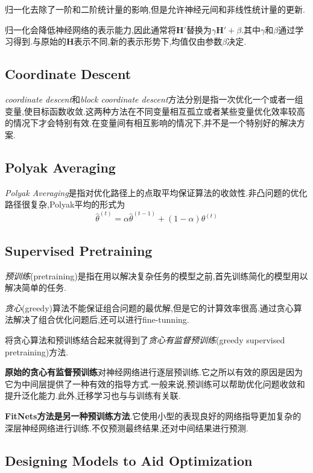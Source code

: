 归一化去除了一阶和二阶统计量的影响,但是允许神经元间和非线性统计量的更新.

归一化会降低神经网络的表示能力,因此通常将$\mathbf H'$替换为$\gamma\mathbf H'+\beta$.其中$\gamma$和$\beta$通过学习得到.与原始的$\mathbf H$表示不同,新的表示形势下,均值仅由参数$\beta$决定.

\subsection{Coordinate Descent}

\textit{coordinate descent}和\textit{block coordinate descent}方法分别是指一次优化一个或者一组变量,使目标函数收敛.这两种方法在不同变量相互孤立或者某些变量优化效率较高的情况下才会特别有效.在变量间有相互影响的情况下,并不是一个特别好的解决方案.

\subsection{Polyak Averaging}

\textit{Polyak Averaging}是指对优化路径上的点取平均保证算法的收敛性.非凸问题的优化路径很复杂,Polyak平均的形式为
\begin{equation}
\hat\theta^{(t)}=\alpha\hat\theta^{(t-1)}+(1-\alpha)\theta^{(t)}
\end{equation}

\subsection{Supervised Pretraining}

\textit{预训练}(pretraining)是指在用以解决复杂任务的模型之前,首先训练简化的模型用以解决简单的任务.

\textit{贪心}(greedy)算法不能保证组合问题的最优解,但是它的计算效率很高.通过贪心算法解决了组合优化问题后,还可以进行fine-tunning.

将贪心算法和预训练结合起来就得到了\textit{贪心有监督预训练}(greedy supervised pretraining)方法.

\textbf{原始的贪心有监督预训练}对神经网络进行逐层预训练.它之所以有效的原因是因为它为中间层提供了一种有效的指导方式.一般来说,预训练可以帮助优化问题收敛和提升泛化能力.此外,迁移学习也与与训练有关联.

\textbf{FitNets方法是另一种预训练方法}.它使用小型的表现良好的网络指导更加复杂的深层神经网络进行训练.不仅预测最终结果,还对中间结果进行预测.

\subsection{Designing Models to Aid Optimization}

